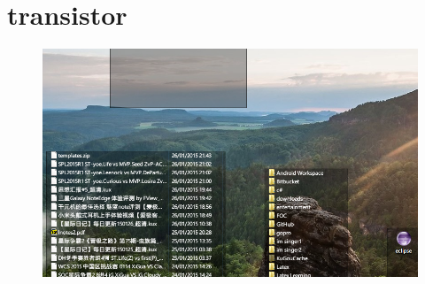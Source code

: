 \chapter{transistor}


\begin{figure}
	\centering
	\includegraphics[width=0.7\linewidth]{../Photo/test}
	\caption{}
	\label{fig:test}
\end{figure}
